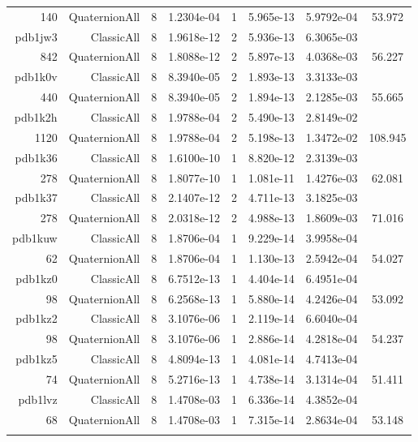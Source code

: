 \begin{xltabular}{\textwidth}{r|rcS[table-format=1.4e+2]cS[table-format=1.3e+2]S[table-format=1.4e+2]S[table-format=-1.3]}
140 & QuaternionAll & 8 & 1.2304e-04 & 1 & 5.965e-13 & 5.9792e-04 & 53.972\\  \addlinespace
pdb1jw3 & ClassicAll & 8 & 1.9618e-12 & 2 & 5.936e-13 & 6.3065e-03 & \\
842 & QuaternionAll & 8 & 1.8088e-12 & 2 & 5.897e-13 & 4.0368e-03 & 56.227\\  \addlinespace
pdb1k0v & ClassicAll & 8 & 8.3940e-05 & 2 & 1.893e-13 & 3.3133e-03 & \\
440 & QuaternionAll & 8 & 8.3940e-05 & 2 & 1.894e-13 & 2.1285e-03 & 55.665\\  \addlinespace
pdb1k2h & ClassicAll & 8 & 1.9788e-04 & 2 & 5.490e-13 & 2.8149e-02 & \\
1120 & QuaternionAll & 8 & 1.9788e-04 & 2 & 5.198e-13 & 1.3472e-02 & 108.945\\  \addlinespace
pdb1k36 & ClassicAll & 8 & 1.6100e-10 & 1 & 8.820e-12 & 2.3139e-03 & \\
278 & QuaternionAll & 8 & 1.8077e-10 & 1 & 1.081e-11 & 1.4276e-03 & 62.081\\  \addlinespace
pdb1k37 & ClassicAll & 8 & 2.1407e-12 & 2 & 4.711e-13 & 3.1825e-03 & \\
278 & QuaternionAll & 8 & 2.0318e-12 & 2 & 4.988e-13 & 1.8609e-03 & 71.016\\  \addlinespace
pdb1kuw & ClassicAll & 8 & 1.8706e-04 & 1 & 9.229e-14 & 3.9958e-04 & \\
62 & QuaternionAll & 8 & 1.8706e-04 & 1 & 1.130e-13 & 2.5942e-04 & 54.027\\  \addlinespace
pdb1kz0 & ClassicAll & 8 & 6.7512e-13 & 1 & 4.404e-14 & 6.4951e-04 & \\
98 & QuaternionAll & 8 & 6.2568e-13 & 1 & 5.880e-14 & 4.2426e-04 & 53.092\\  \addlinespace
pdb1kz2 & ClassicAll & 8 & 3.1076e-06 & 1 & 2.119e-14 & 6.6040e-04 & \\
98 & QuaternionAll & 8 & 3.1076e-06 & 1 & 2.886e-14 & 4.2818e-04 & 54.237\\  \addlinespace
pdb1kz5 & ClassicAll & 8 & 4.8094e-13 & 1 & 4.081e-14 & 4.7413e-04 & \\
74 & QuaternionAll & 8 & 5.2716e-13 & 1 & 4.738e-14 & 3.1314e-04 & 51.411\\  \addlinespace
pdb1lvz & ClassicAll & 8 & 1.4708e-03 & 1 & 6.336e-14 & 4.3852e-04 & \\
68 & QuaternionAll & 8 & 1.4708e-03 & 1 & 7.315e-14 & 2.8634e-04 & 53.148\\  \addlinespace

\end{xltabular}
